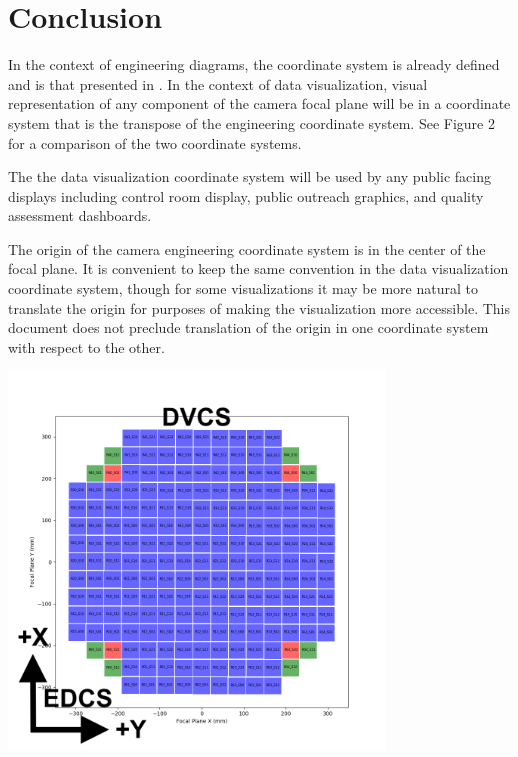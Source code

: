 \section{Conclusion}
In the context of engineering diagrams, the coordinate system is already defined and is that presented in . In the context of data visualization, visual representation of any component of the camera focal plane will be in a coordinate system that is the transpose of the engineering coordinate system.  See Figure 2 for a comparison of the two coordinate systems.

The the data visualization coordinate system will be used by any public facing displays including control room display, public outreach graphics, and quality assessment dashboards.

The origin of the camera engineering coordinate system is in the center of the focal plane. It is convenient to keep the same convention in the data visualization coordinate system, though for some visualizations it may be more natural to translate the origin for purposes of making the visualization more accessible. This document does not preclude translation of the origin in one coordinate system with respect to the other.

\begin{center}
\includegraphics[width=0.75\textwidth]{figures/fp.png}
\end{center}
